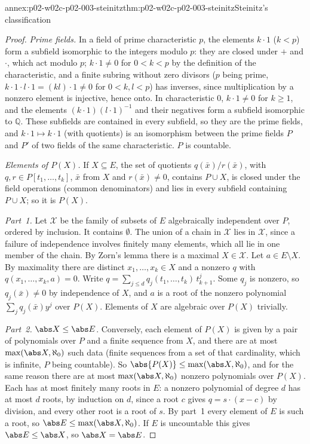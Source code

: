 \begin{annexitem}{annex:p02-w02c-p02-003-steinitz}{thm:p02-w02c-p02-003-steinitz}{Steinitz's classification}
\begin{proof}
\emph{Prime fields.}  In a field of prime characteristic \(p\), the
elements \(k\cdot1\) (\(k<p\)) form a subfield isomorphic to the integers
modulo \(p\): they are closed under \(+\) and \(\cdot\), which act
modulo \(p\); \(k\cdot1\neq0\) for \(0<k<p\) by the definition of the
characteristic, and a finite subring without zero divisors (\(p\) being
prime, \(k\cdot1\cdot l\cdot1=(kl)\cdot1\neq0\) for \(0<k,l<p\)) has
inverses, since multiplication by a nonzero element is injective, hence
onto.  In characteristic \(0\), \(k\cdot1\neq0\) for \(k\geq1\), and the
elements \((k\cdot1)(l\cdot1)^{-1}\) and their negatives form a subfield
isomorphic to \(\mathbb Q\).  These subfields are contained in every
subfield, so they are the prime fields, and \(k\cdot1\mapsto k\cdot1\)
(with quotients) is an isomorphism between the prime fields \(P\) and
\(P'\) of two fields of the same characteristic.  \(P\) is countable.

\emph{Elements of \(P(X)\).}  If \(X\subseteq E\), the set of quotients
\(q(\bar x)/r(\bar x)\), with \(q,r\in P[t_1,\ldots,t_k]\), \(\bar x\) from
\(X\) and \(r(\bar x)\neq0\), contains \(P\cup X\), is closed under the
field operations (common denominators) and lies in every subfield
containing \(P\cup X\); so it is \(P(X)\).

\emph{Part~1.}  Let \(\mathcal X\) be the family of subsets of \(E\)
algebraically independent over \(P\), ordered by inclusion.  It contains
\(\emptyset\).  The union of a chain in \(\mathcal X\) lies in
\(\mathcal X\), since a failure of independence involves finitely many
elements, which all lie in one member of the chain.  By Zorn's lemma
there is a maximal \(X\in\mathcal X\).  Let \(a\in E\setminus X\).  By
maximality there are distinct \(x_1,\ldots,x_k\in X\) and a nonzero \(q\)
with \(q(x_1,\ldots,x_k,a)=0\).  Write
\(q=\sum_{j\leq d}q_j(t_1,\ldots,t_k)\,t_{k+1}^j\).  Some \(q_j\) is
nonzero, so \(q_j(\bar x)\neq0\) by independence of \(X\), and \(a\) is a
root of the nonzero polynomial \(\sum_jq_j(\bar x)y^j\) over \(P(X)\).
Elements of \(X\) are algebraic over \(P(X)\) trivially.

\emph{Part~2.}  \(\abs X\leq\abs E\).  Conversely, each element of
\(P(X)\) is given by a pair of polynomials over \(P\) and a finite
sequence from \(X\), and there are at most \(\max(\abs X,\aleph_0)\) such
data (finite sequences from a set of that cardinality, which is infinite,
\(P\) being countable).  So \(\abs{P(X)}\leq\max(\abs X,\aleph_0)\), and
for the same reason there are at most \(\max(\abs X,\aleph_0)\) nonzero
polynomials over \(P(X)\).  Each has at most finitely many roots in
\(E\): a nonzero polynomial of degree \(d\) has at most \(d\) roots, by
induction on \(d\), since a root \(c\) gives \(q=s\cdot(x-c)\) by
division, and every other root is a root of \(s\).  By part~1 every
element of \(E\) is such a root, so
\(\abs E\leq\max(\abs X,\aleph_0)\).  If \(E\) is uncountable this gives
\(\abs E\leq\abs X\), so \(\abs X=\abs E\).


\end{proof}
\end{annexitem}
